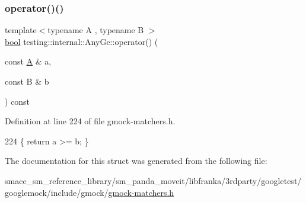\subsubsection{\texorpdfstring{operator()()}{operator()()}}
{\footnotesize\ttfamily template$<$typename A , typename B $>$ \\
\hyperlink{classbool}{bool} testing\+::internal\+::\+Any\+Ge\+::operator() (\begin{DoxyParamCaption}\item[{const \hyperlink{namespacetesting_a5e9134d655d2fc9323902348083282e7}{A} \&}]{a,  }\item[{const B \&}]{b }\end{DoxyParamCaption}) const\hspace{0.3cm}{\ttfamily [inline]}}



Definition at line 224 of file gmock-\/matchers.\+h.


\begin{DoxyCode}
224 \{ \textcolor{keywordflow}{return} a >= b; \}
\end{DoxyCode}


The documentation for this struct was generated from the following file\+:\begin{DoxyCompactItemize}
\item 
smacc\+\_\+sm\+\_\+reference\+\_\+library/sm\+\_\+panda\+\_\+moveit/libfranka/3rdparty/googletest/googlemock/include/gmock/\hyperlink{gmock-matchers_8h}{gmock-\/matchers.\+h}\end{DoxyCompactItemize}
